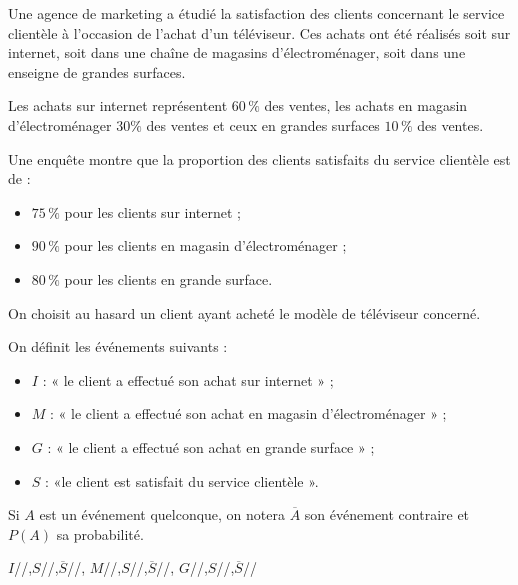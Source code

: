 Une agence de marketing a étudié la satisfaction des clients concernant le service clientèle à l'occasion de l'achat d'un téléviseur. Ces achats ont été réalisés soit sur internet, soit dans une chaîne de magasins d'électroménager, soit dans une enseigne de grandes surfaces.

\smallskip

Les achats sur internet représentent $60\,\%$ des ventes, les achats en magasin d'électroménager $30 \%$ des ventes et ceux en grandes surfaces $10\,\%$ des ventes.

\smallskip

Une enquête montre que la proportion des clients satisfaits du service clientèle est de :

\begin{itemize}
	\item $75\,\%$ pour les clients sur internet ;
	\item $90\,\%$ pour les clients en magasin d'électroménager ;
	\item $80\,\%$ pour les clients en grande surface.
\end{itemize}

On choisit au hasard un client ayant acheté le modèle de téléviseur concerné.

On définit les événements suivants :

\begin{itemize}
	\item $I$ : « le client a effectué son achat sur internet » ;
	\item $M$ : « le client a effectué son achat en magasin d'électroménager » ;
	\item $G$ : « le client a effectué son achat en grande surface » ;
	\item $S$ : «le client est satisfait du service clientèle ».
\end{itemize}

Si $A$ est un événement quelconque, on notera $\overline{A}$ son événement contraire et $P(A)$ sa probabilité.

\begin{wrapstuff}[r]
\begin{EnvArbreProbasTikz}[Type=3x2,PositionProbas=auto,EspaceNiveau=2]{%
	$I$/\numdots/,$S$/\numdots/,$\overline{S}$/\numdots/,%
	$M$/\numdots/,$S$/\numdots/,$\overline{S}$/\numdots/,%
	$G$/\numdots/,$S$/\numdots/,$\overline{S}$/\numdots/}
\end{EnvArbreProbasTikz}
\end{wrapstuff}

